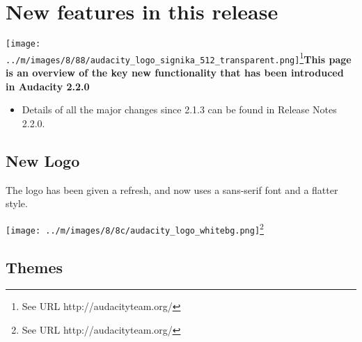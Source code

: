 
																					
\chapter{New features in this release}

\label{f0}																																	%
					

\texttt{[image: ../m/images/8/88/audacity\_logo\_signika\_512\_transparent.png]}\footnote{See URL http://audacityteam.org/}\newline\textbf{This page is an overview of the key new functionality that has been introduced in Audacity 2.2.0}
\begin{itemize}
\item  Details of all the major changes since 2.1.3 can be found in Release Notes 2.2.0.
\end{itemize}





\section{New Logo}


The logo has been given a refresh, and now uses a sans-serif font and a flatter style.

\texttt{[image: ../m/images/8/8c/audacity\_logo\_whitebg.png]}\footnote{See URL http://audacityteam.org/}


\section{Themes}


